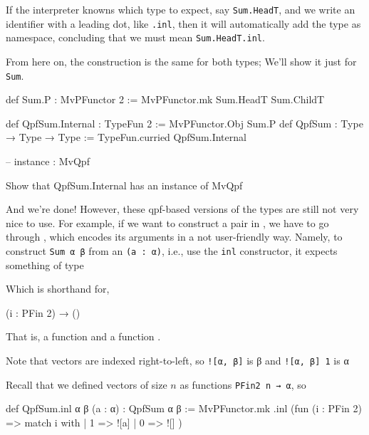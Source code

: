 \documentclass[titlepage]{report}
\newenvironment{remark}[1][Remark:]{\begin{trivlist}                         
    \item[\hskip \labelsep {\bfseries #1}]}{\end{trivlist}}
\newenvironment{todo}[1][Todo:]{\begin{trivlist}                         
    \item[\hskip \labelsep {\bfseries #1}]}{\end{trivlist}}
\begin{document}
\begin{remark}
    If the interpreter knowns which type to expect, say \texttt{Sum.HeadT}, and we write an identifier with a leading
    dot, like \texttt{.inl}, then it will automatically add the type as namespace, concluding that
    we must mean \texttt{Sum.HeadT.inl}.
\end{remark}
From here on, the construction is the same for both types;
We'll show it just for \texttt{Sum}.
\begin{center}
    \begin{leancode}
    def Sum.P  : MvPFunctor 2 := MvPFunctor.mk Sum.HeadT  Sum.ChildT

    
    def QpfSum.Internal : TypeFun 2  := MvPFunctor.Obj Sum.P
    def QpfSum : Type → Type → Type := TypeFun.curried QpfSum.Internal

    -- instance : MvQpf 
  \end{leancode}
\end{center}



\begin{todo}
    Show that QpfSum.Internal has an instance of MvQpf
\end{todo}

And we're done! However, these qpf-based versions of the types are still not very nice to use.
For example, if we want to construct a pair in , we have to go through ,
which encodes its arguments in a not user-friendly way. 
Namely, to construct \texttt{Sum α β} from an \texttt{(a : α)}, i.e., use the \texttt{inl} constructor, 
it expects something of type
\begin{center}
\end{center}
Which is shorthand for, 
\begin{center}
    (i : PFin 2) → ()
\end{center}
That is, a function  and a function .
\begin{remark}
    Note that vectors are indexed right-to-left, so \texttt{![α, β]} is β
    and \texttt{![α, β] 1} is α
\end{remark}

Recall that we defined vectors of size $n$ as functions \texttt{PFin2 n → α}, so 


\begin{leancode}
    def QpfSum.inl {α β} (a : α) : QpfSum α β :=
      MvPFunctor.mk .inl (fun (i : PFin 2) => match i with
        | 1 => ![a]
        | 0 => ![]
      )
\end{leancode}
\end{document}
